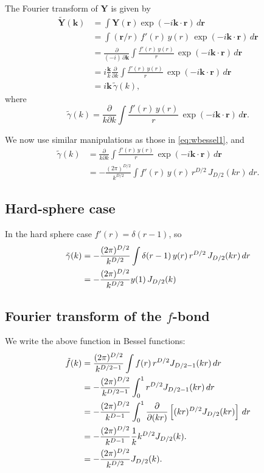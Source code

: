 \documentclass[preprint]{revtex4-1}
\numberwithin{equation}{subsection}
\numberwithin{table}{section}
\newcommand{\vct}[1]{\mathbf{#1}}
\providecommand{\vr}{} %
\renewcommand{\vr}{\vct{r}}
\newcommand{\vk}{\vct{k}}
\begin{document}
The Fourier transform of $\vct{Y}$ is given by
\begin{align*}
  \tilde{\vct{Y}}(\vk)
&=
\int \vct{Y}(\vr) \exp(-i\vk\cdot\vr) \, d\vr
\\
&=
\int (\vr/r) \, f'(r) \, y(r) \, \exp(-i\vk\cdot\vr) \, d\vr
\\
&=
\frac{\partial}{(-i) \, \partial \vk}
\int \frac{f'(r) \, y(r)}{r} \, \exp(-i\vk\cdot\vr) \, d\vr
\\
&=
i \frac{\vk}{k} \frac{\partial}{\partial k}
\int \frac{f'(r) \, y(r)}{r} \, \exp(-i\vk\cdot\vr) \, d\vr
\\
&=
i \vk \, \tilde{\gamma}(k),
\end{align*}
%
where
\[
\tilde{\gamma}(k)
=
\frac{\partial}{k\partial k}
\int \frac{f'(r) \, y(r)}{r} \, \exp(-i\vk\cdot\vr) \, d\vr.
\]

We now use similar manipulations as
those in \eqref{eq:wbessel1}, and
\begin{align*}
\tilde{\gamma}(k)
&=
\frac{\partial}{k\partial k}
\int \frac{f'(r) \, y(r)}{r} \, \exp(-i\vk\cdot\vr) \, d\vr
\\
&=-\frac{(2\pi)^{D/2}}{k^{D/2}}
\int f'(r) \, y(r) \, r^{D/2} \, J_{D/2}(kr) \, dr.
\end{align*}


\subsection{Hard-sphere case}

In the hard sphere case $f'(r) = \delta(r - 1)$,
so
\begin{align}
\tilde{\gamma}(k)
&=-\frac{(2\pi)^{D/2}}{k^{D/2}}
\int \delta(r - 1) \, y(r) \, r^{D/2} \, J_{D/2}(kr) \, dr
\notag \\
&=-\frac{(2\pi)^{D/2}}{k^{D/2}}
y(1) \, J_{D/2}(k)
\label{eq:gammahs}
\end{align}



\subsection{Fourier transform of the $f$-bond}

We write the above function in Bessel functions:
\begin{align}
  \tilde{f}(k)
&=
\frac{(2\pi)^{D/2}}{k^{D/2-1}}
\int f(r) \, r^{D/2} J_{D/2-1}(kr) \, dr
\notag \\
&=
-\frac{(2\pi)^{D/2}}{k^{D/2-1}}
\int_0^1 r^{D/2} J_{D/2-1}(kr) \, dr
\notag \\
&=
-\frac{(2\pi)^{D/2}}{k^{D-1}}
\int_0^1 \frac{\partial}{\partial (kr)}
\left[(kr)^{D/2} J_{D/2}(kr) \right] \, dr
\notag \\
&=
-\frac{(2\pi)^{D/2}}{k^{D-1}} \frac{1}{k}
k^{D/2} J_{D/2}(k).
\notag \\
&=
-\frac{(2\pi)^{D/2}}{k^{D/2}} J_{D/2}(k).
\end{align}
\end{document}
